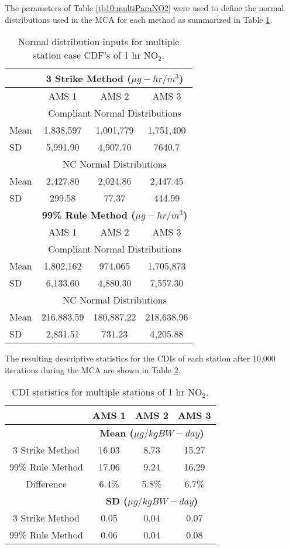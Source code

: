 The parameters of Table \ref{tb10:multiParaNO2} were used to define the normal distributions used in the MCA for each method as summarized in Table \ref{tb11:multiNO2}.
% 
\begin{table}[H]
\centering
\caption{Normal distribution inputs for multiple station case CDF’s of 1 hr NO$_{2}$.}
\label{tb11:multiNO2}
\begin{tabular}{@{}lccc@{}}
\toprule
 & \multicolumn{3}{c}{\textbf{3 Strike Method ($\mu g-hr/m^{3}$)}} \\ \midrule
 & AMS 1 & AMS 2 & AMS 3 \\
 & \multicolumn{3}{c}{Compliant Normal Distributions} \\
Mean & 1,838,597 & 1,001,779 & 1,751,400 \\
SD & 5,991.90 & 4,907.70 & 7640.7 \\
 & \multicolumn{3}{c}{NC Normal Distributions} \\
Mean & 2,427.80 & 2,024.86 & 2,447.45 \\
SD & 299.58 & 77.37 & 444.99 \\
 & \multicolumn{3}{c}{\textbf{99\% Rule Method ($\mu g-hr/m^{3}$)}} \\
 & AMS 1 & AMS 2 & AMS 3 \\
 & \multicolumn{3}{c}{Compliant Normal Distributions} \\
Mean & 1,802,162 & 974,065 & 1,705,873 \\
SD & 6,133.60 & 4,880.30 & 7,557.30 \\
 & \multicolumn{3}{c}{NC Normal Distributions} \\
Mean & 216,883.59 & 180,887.22 & 218,638.96 \\
SD & 2,831.51 & 731.23 & 4,205.88 \\ \bottomrule
\end{tabular}
\end{table}

The resulting descriptive statistics for the CDIs of each station after 10,000 iterations during the MCA are shown in Table \ref{tb12:CDIstatsNO2}. 
%
\begin{table}[H]
\centering
\caption{CDI statistics for multiple stations of 1 hr NO$_{2}$.}
\label{tb12:CDIstatsNO2}
\begin{tabular}{@{}cccc@{}}
\toprule
 & \textbf{AMS 1} & \textbf{AMS 2} & \textbf{AMS 3} \\ \midrule
 & \multicolumn{3}{c}{\textbf{Mean ($\mu g/kgBW-day$)}} \\
3 Strike Method & 16.03 & 8.73 & 15.27 \\
99\% Rule Method & 17.06 & 9.24 & 16.29 \\
Difference & 6.4\% & 5.8\% & 6.7\% \\
 & \multicolumn{3}{c}{\textbf{SD ($\mu g/kgBW-day$)}} \\
3 Strike Method & 0.05 & 0.04 & 0.07 \\
99\% Rule Method & 0.06 & 0.04 & 0.08 \\ \bottomrule
\end{tabular}
\end{table}

